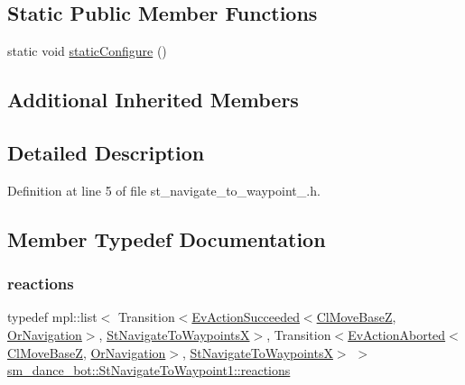 \subsection*{Static Public Member Functions}
\begin{DoxyCompactItemize}
\item 
static void \hyperlink{structsm__dance__bot_1_1StNavigateToWaypoint1_ae64899be8775f9ac0aaaead84c5cba5f}{static\+Configure} ()
\end{DoxyCompactItemize}
\subsection*{Additional Inherited Members}


\subsection{Detailed Description}


Definition at line 5 of file st\+\_\+navigate\+\_\+to\+\_\+waypoint\+\_.\+h.



\subsection{Member Typedef Documentation}
\mbox{\label{structsm__dance__bot_1_1StNavigateToWaypoint1_a259ea139b570872152c7d09219555653}} 
\subsubsection{\texorpdfstring{reactions}{reactions}}
{\footnotesize\ttfamily typedef mpl\+::list$<$ Transition$<$\hyperlink{structsmacc_1_1default__events_1_1EvActionSucceeded}{Ev\+Action\+Succeeded}$<$\hyperlink{classcl__move__base__z_1_1ClMoveBaseZ}{Cl\+Move\+BaseZ}, \hyperlink{classsm__dance__bot_1_1OrNavigation}{Or\+Navigation}$>$, \hyperlink{structsm__dance__bot_1_1StNavigateToWaypointsX}{St\+Navigate\+To\+WaypointsX}$>$, Transition$<$\hyperlink{structsmacc_1_1default__events_1_1EvActionAborted}{Ev\+Action\+Aborted}$<$\hyperlink{classcl__move__base__z_1_1ClMoveBaseZ}{Cl\+Move\+BaseZ}, \hyperlink{classsm__dance__bot_1_1OrNavigation}{Or\+Navigation}$>$, \hyperlink{structsm__dance__bot_1_1StNavigateToWaypointsX}{St\+Navigate\+To\+WaypointsX}$>$ $>$ \hyperlink{structsm__dance__bot_1_1StNavigateToWaypoint1_a259ea139b570872152c7d09219555653}{sm\+\_\+dance\+\_\+bot\+::\+St\+Navigate\+To\+Waypoint1\+::reactions}}




